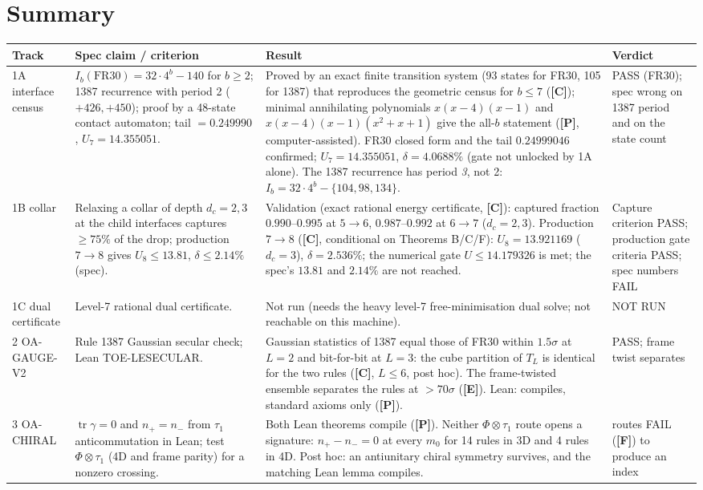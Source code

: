 \documentclass[10pt]{article}
\newcommand{\lab}[1]{\textbf{[#1]}}
\begin{document}
\section*{Summary}
\begin{longtable}{p{1.7cm}p{3.6cm}p{8.0cm}p{2.5cm}}
\toprule
Track & Spec claim / criterion & Result & Verdict\\ \midrule\endhead
1A interface census & $I_b(\mathrm{FR30})=32\cdot4^b-140$ for $b\ge2$; 1387 recurrence with period 2 ($+426,+450$); proof by a 48-state contact automaton; tail $=0.249990$, $U_7=14.355051$. & Proved by an exact finite transition system (93 states for FR30, 105 for 1387) that reproduces the geometric census for $b\le7$ (\lab{C}); minimal annihilating polynomials $x(x-4)(x-1)$ and $x(x-4)(x-1)(x^2+x+1)$ give the all-$b$ statement (\lab{P}, computer-assisted). FR30 closed form and the tail $0.24999046$ confirmed; $U_7=14.355051$, $\delta=4.0688\%$ (gate not unlocked by 1A alone). The 1387 recurrence has period \emph{3}, not 2: $I_b=32\cdot4^b-\{104,98,134\}$. & PASS (FR30); spec wrong on 1387 period and on the state count\\
1B collar & Relaxing a collar of depth $d_c=2,3$ at the child interfaces captures $\ge75\%$ of the drop; production $7\to8$ gives $U_8\le13.81$, $\delta\le2.14\%$ (spec). & Validation (exact rational energy certificate, \lab{C}): captured fraction $0.990$--$0.995$ at $5\to6$, $0.987$--$0.992$ at $6\to7$ ($d_c=2,3$). Production $7\to8$ (\lab{C}, conditional on Theorems B/C/F): $U_8=13.921169$ ($d_c=3$), $\delta=2.536\%$; the numerical gate $U\le14.179326$ is met; the spec's $13.81$ and $2.14\%$ are not reached. & Capture criterion PASS; production gate criteria PASS; spec numbers FAIL\\
1C dual certificate & Level-7 rational dual certificate. & Not run (needs the heavy level-7 free-minimisation dual solve; not reachable on this machine). & NOT RUN\\
2 OA-GAUGE-V2 & Rule 1387 Gaussian secular check; Lean TOE-LESECULAR. & Gaussian statistics of 1387 equal those of FR30 within $1.5\sigma$ at $L=2$ and bit-for-bit at $L=3$: the cube partition of $T_L$ is identical for the two rules (\lab{C}, $L\le6$, post hoc). The frame-twisted ensemble separates the rules at $>70\sigma$ (\lab{E}). Lean: compiles, standard axioms only (\lab{P}). & PASS; frame twist separates\\
3 OA-CHIRAL & $\operatorname{tr}\gamma=0$ and $n_+=n_-$ from $\tau_1$ anticommutation in Lean; test $\Phi\otimes\tau_1$ (4D and frame parity) for a nonzero crossing. & Both Lean theorems compile (\lab{P}). Neither $\Phi\otimes\tau_1$ route opens a signature: $n_+-n_-=0$ at every $m_0$ for 14 rules in 3D and 4 rules in 4D. Post hoc: an antiunitary chiral symmetry survives, and the matching Lean lemma compiles. & routes FAIL (\lab{F}) to produce an index\\

\end{longtable}
\end{document}
